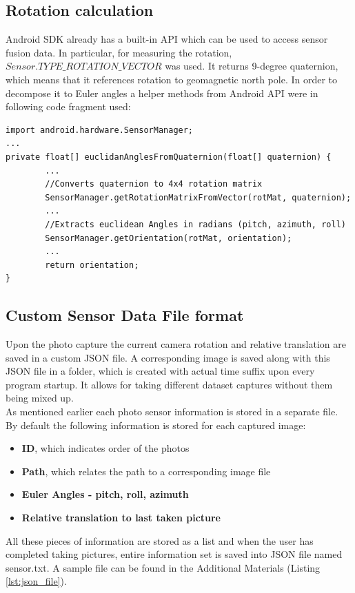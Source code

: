 \subsection{Rotation calculation} \label{sec:rot_cal}
Android SDK already has a built-in API which can be used to access sensor fusion data. In particular, for measuring the rotation, $Sensor.TYPE\_ROTATION\_VECTOR$ was used. It returns 9-degree quaternion, which means that it references rotation to geomagnetic north pole. In order to decompose it to Euler angles a helper methods from Android API were in following code fragment used:
\lstset{escapechar=@,style=customjava}
\begin{lstlisting}
import android.hardware.SensorManager;
...
private float[] euclidanAnglesFromQuaternion(float[] quaternion) {
        ...
        //Converts quaternion to 4x4 rotation matrix
        SensorManager.getRotationMatrixFromVector(rotMat, quaternion);
        ...
        //Extracts euclidean Angles in radians (pitch, azimuth, roll)
        SensorManager.getOrientation(rotMat, orientation);
        ...
        return orientation;
}
\end{lstlisting}
\subsection{Custom Sensor Data File format}
Upon the photo capture the current camera rotation and relative translation are saved in a custom JSON file. A corresponding image is saved along with this JSON file in a folder, which is created with actual time suffix upon every program startup. It allows for taking different dataset captures without them being mixed up. \\
As mentioned earlier each photo sensor information is stored in a separate file. By default the following information is stored for each captured image:
\begin{itemize}
\item \textbf{ID}, which indicates order of the photos
\item \textbf{Path}, which relates the path to a corresponding image file
\item \textbf{Euler Angles - pitch, roll, azimuth}
\item \textbf{Relative translation to last taken picture}
\end{itemize} 
All these pieces of information are stored as a list and when the user has completed taking pictures, entire information set is saved into JSON file named sensor.txt. A sample file can be found in the Additional Materials (Listing \ref{lst:json_file}).
\clearpage
